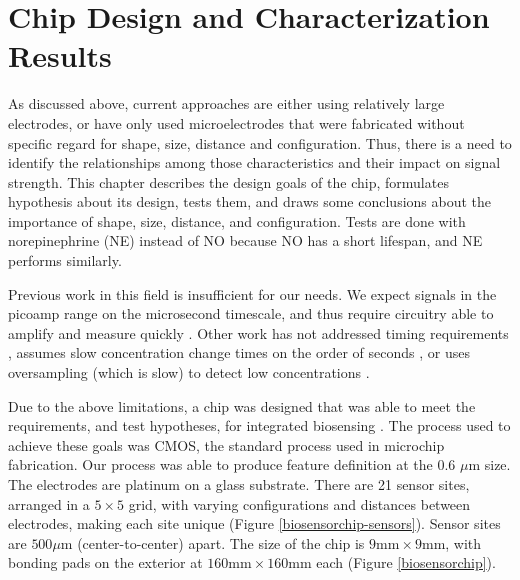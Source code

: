 \chapter{Chip Design and Characterization Results}

As discussed above, current approaches are either using relatively large electrodes, or have only used microelectrodes that were fabricated without specific regard for shape, size, distance and configuration. Thus, there is a need to identify the relationships among those characteristics and their impact on signal strength. This chapter describes the design goals of the chip, formulates hypothesis about its design, tests them, and draws some conclusions about the importance of shape, size, distance, and configuration. Tests are done with norepinephrine (NE) instead of NO because NO has a short lifespan, and NE performs similarly.

Previous work in this field is insufficient for our needs. We expect signals in the picoamp range on the microsecond timescale, and thus require circuitry able to amplify and measure quickly \cite{mosharok2005aee}. Other work has not addressed timing requirements \cite{zhang2005eam, steffan2007scp}, assumes slow concentration change times on the order of seconds \cite{murari2005ipn}, or uses oversampling (which is slow) to detect low concentrations \cite{murari2005ipn, stanacevic2007vpa}.

Due to the above limitations, a chip was designed that was able to meet the requirements, and test hypotheses, for integrated biosensing \cite{karegar2007ema}. The process used to achieve these goals was CMOS, the standard process used in microchip fabrication. Our process was able to produce feature definition at the 0.6 $\mu \mathrm{m}$ size. The electrodes are platinum on a glass substrate. There are 21 sensor sites, arranged in a $5 \times 5$ grid, with varying configurations and distances between electrodes, making each site unique (Figure \ref{biosensorchip-sensors}). Sensor sites are $500 \mu \mathrm{m}$ (center-to-center) apart. The size of the chip is $9 \mathrm{mm} \times 9 \mathrm{mm}$, with bonding pads on the exterior at $160 \mathrm{mm} \times 160 \mathrm{mm}$ each (Figure \ref{biosensorchip}).

